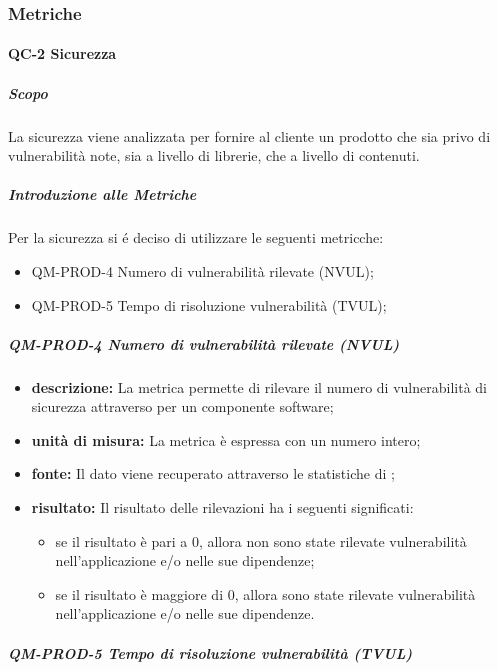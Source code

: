 		\subsubsection{Metriche}
				




		\paragraph{QC-2 Sicurezza}
		\subparagraph{Scopo}
			La sicurezza viene analizzata per fornire al cliente un prodotto che sia privo di vulnerabilità note, sia a livello di librerie, che a livello di contenuti.
		\subparagraph{Introduzione alle Metriche}
			Per la sicurezza si é deciso di utilizzare le seguenti metricche:
			\begin{itemize}
				\item QM-PROD-4 Numero di vulnerabilità rilevate (NVUL);
				\item QM-PROD-5 Tempo di risoluzione vulnerabilità (TVUL);
			\end{itemize}
			\subparagraph{ QM-PROD-4 Numero di vulnerabilità rilevate (NVUL)}
			\begin{itemize}
      			\item \textbf{descrizione: }
					La metrica permette di rilevare il numero di vulnerabilità di sicurezza attraverso  per un componente software;
				\item \textbf{unità di misura: }
					La metrica è espressa con un numero intero;
				\item \textbf{fonte: }
					Il dato viene recuperato attraverso le statistiche di ;
				\item \textbf{risultato: }
					Il risultato delle rilevazioni ha i seguenti significati:
					\begin{itemize}
						\item se il risultato è pari a 0, allora non sono state rilevate vulnerabilità nell'applicazione e/o nelle sue dipendenze;
						\item se il risultato è maggiore di 0, allora sono state rilevate vulnerabilità nell'applicazione e/o nelle sue dipendenze.
					\end{itemize}
			\end{itemize}
			\subparagraph{ QM-PROD-5 Tempo di risoluzione vulnerabilità (TVUL) }
